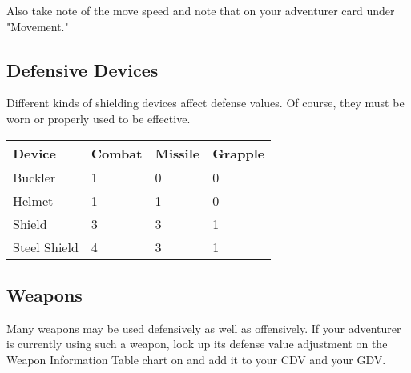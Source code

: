 Also take note of the move speed and note that on your adventurer card under "Movement."
\subsection{Defensive Devices}

Different kinds of shielding devices affect defense values. Of course, they must be worn or properly used to be effective.
\begin{normbox}
\small
\begin{tabular}{l l l l}
\textbf{Device}  & \textbf{Combat}  & \textbf{Missile}  & \textbf{Grapple} \\
\midrule
Buckler & 1 & 0 & 0\\
Helmet & 1 & 1 & 0\\
Shield & 3 & 3 & 1\\
Steel Shield & 4 & 3 & 1\\
\end{tabular}
\end{normbox}

\subsection{Weapons}

Many weapons may be used defensively as well as offensively. If your adventurer is currently using such a weapon, look up its defense value adjustment on the Weapon Information Table chart on  and add it to your CDV and your GDV.
